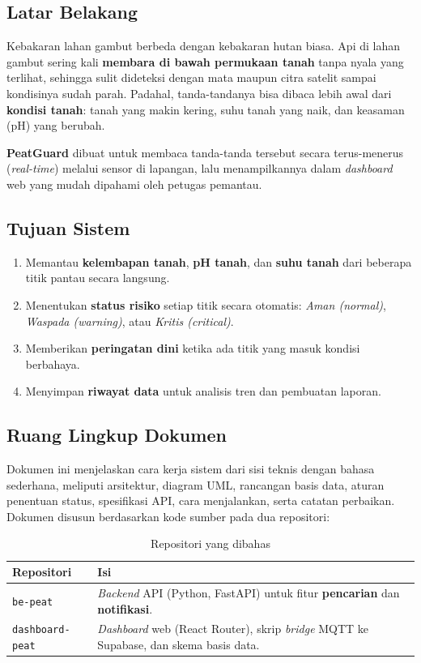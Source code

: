 \documentclass[11pt,a4paper]{article}
\newcommand{\kode}[1]{\texttt{#1}}
\begin{document}
\subsection{Latar Belakang}
Kebakaran lahan gambut berbeda dengan kebakaran hutan biasa. Api di lahan gambut
sering kali \textbf{membara di bawah permukaan tanah} tanpa nyala yang terlihat,
sehingga sulit dideteksi dengan mata maupun citra satelit sampai kondisinya sudah parah.
Padahal, tanda-tandanya bisa dibaca lebih awal dari \textbf{kondisi tanah}:
tanah yang makin kering, suhu tanah yang naik, dan keasaman (pH) yang berubah.

\textbf{PeatGuard} dibuat untuk membaca tanda-tanda tersebut secara terus-menerus
(\textit{real-time}) melalui sensor di lapangan, lalu menampilkannya dalam
\textit{dashboard} web yang mudah dipahami oleh petugas pemantau.

\subsection{Tujuan Sistem}
\begin{enumerate}
  \item Memantau \textbf{kelembapan tanah}, \textbf{pH tanah}, dan \textbf{suhu tanah}
        dari beberapa titik pantau secara langsung.
  \item Menentukan \textbf{status risiko} setiap titik secara otomatis:
        \textit{Aman (normal)}, \textit{Waspada (warning)}, atau \textit{Kritis (critical)}.
  \item Memberikan \textbf{peringatan dini} ketika ada titik yang masuk kondisi berbahaya.
  \item Menyimpan \textbf{riwayat data} untuk analisis tren dan pembuatan laporan.
\end{enumerate}

\subsection{Ruang Lingkup Dokumen}
Dokumen ini menjelaskan cara kerja sistem dari sisi teknis dengan bahasa sederhana,
meliputi arsitektur, diagram UML, rancangan basis data, aturan penentuan status,
spesifikasi API, cara menjalankan, serta catatan perbaikan. Dokumen disusun
berdasarkan kode sumber pada dua repositori:

\begin{table}[H]
\centering
\caption{Repositori yang dibahas}
\label{tab:repo}
\begin{tabularx}{\linewidth}{@{}lL@{}}
\toprule
\textbf{Repositori} & \textbf{Isi} \\
\midrule
\kode{be-peat}        & \textit{Backend} API (Python, FastAPI) untuk fitur \textbf{pencarian} dan \textbf{notifikasi}. \\
\kode{dashboard-peat} & \textit{Dashboard} web (React Router), skrip \textit{bridge} MQTT ke Supabase, dan skema basis data. \\
\bottomrule
\end{tabularx}
\end{table}
\end{document}
